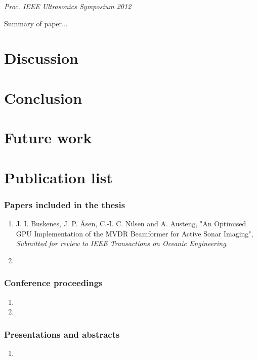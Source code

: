 \vspace{0.3 cm}
{\it Proc. IEEE Ultrasonics Symposium 2012}
\vspace{0.3 cm}

Summary of paper...

\section{Discussion}

\section{Conclusion}

\section{Future work}

\section{Publication list}

\subsubsection{Papers included in the thesis}
\begin{enumerate}
	\item J. I. Buskenes, J. P. \AA{}sen, C.-I. C. Nilsen and A. Austeng, "An Optimised GPU Implementation of the MVDR Beamformer for Active Sonar Imaging", {\it Submitted for review to IEEE Transactions on Oceanic Engineering}.
	\item 
\end{enumerate}  
  
\subsubsection{Conference proceedings}
\begin{enumerate}
	\item 
	\item 
\end{enumerate}


\subsubsection{Presentations and abstracts}
\begin{enumerate}
	\item
\end{enumerate}

			
\endinput
